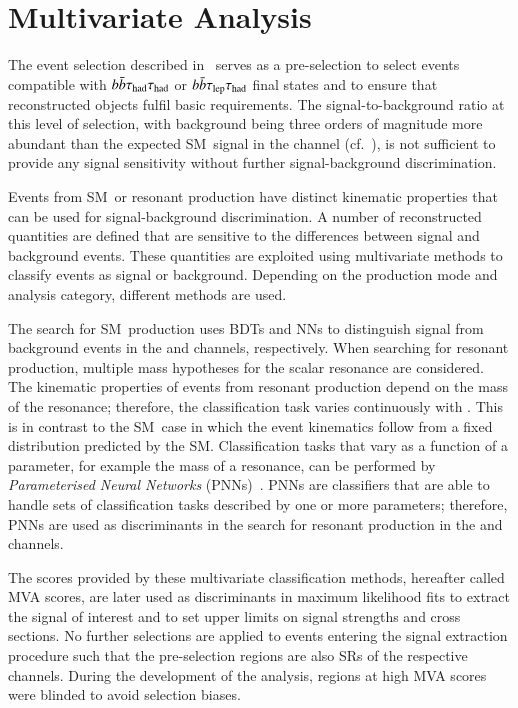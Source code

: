 \section{Multivariate Analysis}%
\label{sec:multivariate_analysis}

The event selection described in~ serves as a
pre-selection to select events compatible with $b\bar{b}\tau_{\text{had}}\tau_{\text{had}}$ or
$b\bar{b}\tau_{\text{lep}}\tau_{\text{had}}$ final states and to ensure that reconstructed objects fulfil
basic requirements. The signal-to-background ratio at this level of selection,
with background being three orders of magnitude more abundant than the expected
SM~\HH signal in the \hadhad channel (cf.~), is
not sufficient to provide any signal sensitivity without further
signal-background discrimination.

Events from SM~\HH or resonant \HH production have distinct kinematic properties
that can be used for signal-background discrimination. A number of reconstructed
quantities are defined that are sensitive to the differences between signal and
background events. These quantities are exploited using multivariate methods to
classify events as signal or background. Depending on the \HH production mode
and analysis category, different methods are used.

The search for SM~\HH production uses BDTs and NNs to distinguish signal from
background events in the \hadhad and \lephad channels, respectively. When
searching for resonant \HH production, multiple mass hypotheses for the scalar
resonance are considered. The kinematic properties of events from resonant \HH
production depend on the mass of the resonance; therefore, the classification
task varies continuously with \mX. This is in contrast to the SM~\HH case in
which the event kinematics follow from a fixed distribution predicted by the
SM. Classification tasks that vary as a function of a parameter, for example the
mass of a resonance, can be performed by \emph{Parameterised Neural Networks}
(PNNs)~\cite{Baldi:2016fzo}.
PNNs are classifiers that are able to handle sets of classification tasks
described by one or more parameters; therefore, PNNs are used as discriminants
in the search for resonant \HH production in the \hadhad and \lephad channels.

The scores provided by these multivariate classification methods, hereafter
called MVA scores, are later used as discriminants in maximum likelihood fits to
extract the signal of interest and to set upper limits on signal strengths and
cross sections. No further selections are applied to events entering the signal
extraction procedure such that the pre-selection regions are also SRs of the
respective channels. During the development of the analysis, regions at high MVA
scores were blinded to avoid selection biases.

